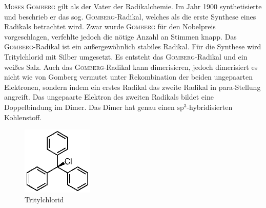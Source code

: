 \documentclass[../kl11.tex]{subfiles}
\begin{document}
\textsc{Moses Gomberg} gilt als der Vater der Radikalchemie. Im Jahr 1900 synthetisierte und beschrieb er das sog. \textsc{Gomberg}-Radikal, welches als die erste Synthese eines Radikals betrachtet wird. Zwar wurde \textsc{Gomberg} für den Nobelpreis vorgeschlagen, verfehlte jedoch die nötige Anzahl an Stimmen knapp.
Das \textsc{Gomberg}-Radikal ist ein außergewöhnlich stabiles Radikal. Für die Synthese wird Tritylchlorid mit Silber umgesetzt. Es entsteht das \textsc{Gomberg}-Radikal und ein weißes Salz. Auch das \textsc{Gomberg}-Radikal kann dimerisieren, jedoch dimerisiert es nicht wie von Gomberg vermutet unter Rekombination der beiden ungepaarten Elektronen, sondern indem ein erstes Radikal das zweite Radikal in para-Stellung angreift. Das ungepaarte Elektron des zweiten Radikals bildet eine Doppelbindung im Dimer. Das Dimer hat genau einen $\mathrm{sp^3}$-hybridisierten Kohlenstoff.
\begin{figure}[H]
    \centering
    \includegraphics[width=0.3\textwidth]{2024/Abbildungen/Radikal/Tritylchlorid.eps}
    \caption{Tritylchlorid}
    \label{}
\end{figure}
\newpage
{}

\end{document}
